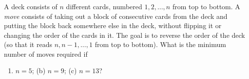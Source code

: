 A deck consists of $n$ different cards, numbered $1,2,\dots,n$ from top to bottom. A \emph{move} consists of taking out a block of consecutive cards from the deck and putting the block back somewhere else in the deck, without flipping it or changing the order of the cards in it. The goal is to reverse the order of the deck (so that it reads $n,n-1,\dots,1$ from top to bottom). What is the minimum number of moves required if
\begin{enumerate}
\item[(a)] $n=5$; \quad (b) $n=9$; \quad (c) $n=13$?
\end{enumerate}

